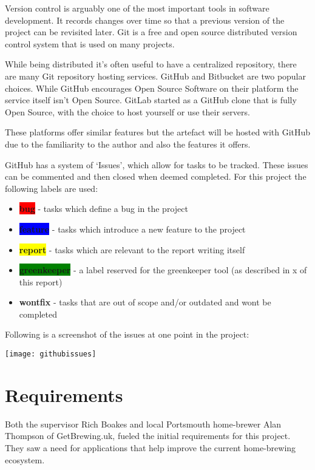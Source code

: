 Version control is arguably one of the most important tools in software development. It records changes over time so that a previous version of the project can be revisited later. Git is a free and open source distributed version control system that is used on many projects. \cite{git}

While being distributed it's often useful to have a centralized repository, there are many Git repository hosting services. GitHub and Bitbucket are two popular choices. While GitHub encourages Open Source Software on their platform the service itself isn't Open Source. \cite{github} GitLab started as a GitHub clone that is fully Open Source, with the choice to host yourself or use their servers. \cite{gitlab} \cite{bitbucket}

These platforms offer similar features but the artefact will be hosted with GitHub due to the familiarity to the author and also the features it offers.

GitHub has a system of `Issues', which allow for tasks to be tracked. These issues can be commented and then closed when deemed completed. For this project the following labels are used:

\begin{itemize}
  \item \textbf{\colorbox{red}{bug}} - tasks which define a bug in the project
  \item \textbf{\colorbox{blue}{feature}} -  tasks which introduce a new feature to the project
  \item \textbf{\colorbox{yellow}{report}} - tasks which are relevant to the report writing itself
  \item \textbf{\colorbox{green}{greenkeeper}} - a label reserved for the greenkeeper tool (as described in x of this report)
  \item \textbf{wontfix} - tasks that are out of scope and/or outdated and wont be completed
\end{itemize}

Following is a screenshot of the issues at one point in the project:

\texttt{[image: githubissues]}

\section{Requirements} \label{a-d--requirements}

Both the supervisor Rich Boakes and local Portsmouth home-brewer Alan Thompson of GetBrewing.uk, fueled the initial requirements for this project. They saw a need for applications that help improve the current home-brewing ecosystem.

